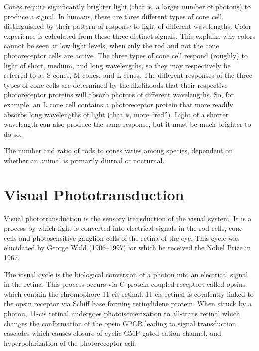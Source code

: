 Cones require significantly brighter light (that is, a larger number of photons) to produce a signal. In humans, there are three different types of cone cell, distinguished by their pattern of response to light of different wavelengths. Color experience is calculated from these three distinct signals. This explains why colors cannot be seen at low light levels, when only the rod and not the cone photoreceptor cells are active. The three types of cone cell respond (roughly) to light of short, medium, and long wavelengths, so they may respectively be referred to as S-cones, M-cones, and L-cones. The different responses of the three types of cone cells are determined by the likelihoods that their respective photoreceptor proteins will absorb photons of different wavelengths. So, for example, an L cone cell contains a photoreceptor protein that more readily absorbs long wavelengths of light (that is, more ``red''). Light of a shorter wavelength can also produce the same response, but it must be much brighter to do so.

The number and ratio of rods to cones varies among species, dependent on whether an animal is primarily diurnal or nocturnal.

\hypertarget{visual-phototransduction}{%
\section{Visual Phototransduction}\label{visual-phototransduction}}

Visual phototransduction is the sensory transduction of the visual system. It is a process by which light is converted into electrical signals in the rod cells, cone cells and photosensitive ganglion cells of the retina of the eye. This cycle was elucidated by \href{https://en.wikipedia.org/wiki/George_Wald}{George Wald} (1906--1997) for which he received the Nobel Prize in 1967.

The visual cycle is the biological conversion of a photon into an electrical signal in the retina. This process occurs via G-protein coupled receptors called opsins which contain the chromophore 11-cis retinal. 11-cis retinal is covalently linked to the opsin receptor via Schiff base forming retinylidene protein. When struck by a photon, 11-cis retinal undergoes photoisomerization to all-trans retinal which changes the conformation of the opsin GPCR leading to signal transduction cascades which causes closure of cyclic GMP-gated cation channel, and hyperpolarization of the photoreceptor cell.

